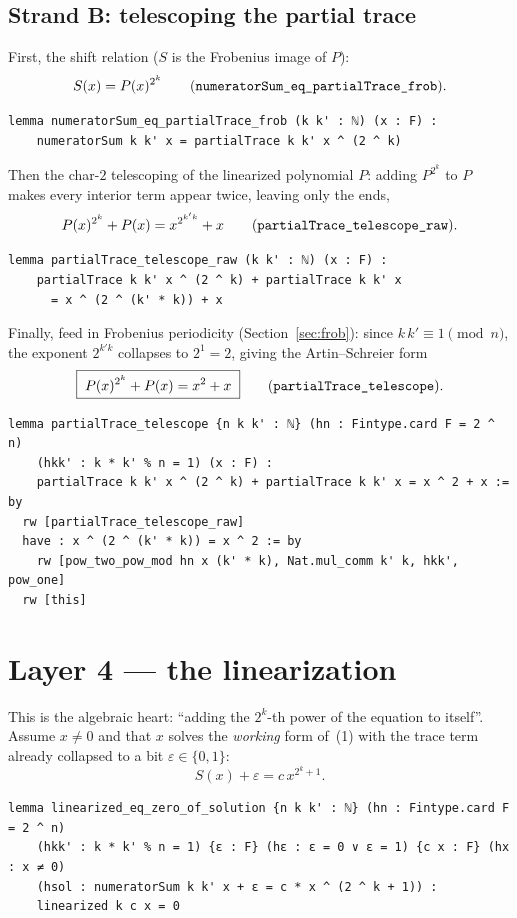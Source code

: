 \documentclass[11pt]{article}
\newcommand{\lc}[1]{\texttt{#1}}
\begin{document}
\subsection{Strand B: telescoping the partial trace}
First, the shift relation ($S$ is the Frobenius image of $P$):
\[
  S(x)=P(x)^{2^k}\qquad\text{(\lc{numeratorSum\_eq\_partialTrace\_frob})}.
\]
\begin{lstlisting}
lemma numeratorSum_eq_partialTrace_frob (k k' : ℕ) (x : F) :
    numeratorSum k k' x = partialTrace k k' x ^ (2 ^ k)
\end{lstlisting}
Then the char-$2$ telescoping of the linearized polynomial $P$: adding
$P^{2^k}$ to $P$ makes every interior term appear twice, leaving only the ends,
\[
  P(x)^{2^k}+P(x)=x^{2^{k'k}}+x
  \qquad\text{(\lc{partialTrace\_telescope\_raw})}.
\]
\begin{lstlisting}
lemma partialTrace_telescope_raw (k k' : ℕ) (x : F) :
    partialTrace k k' x ^ (2 ^ k) + partialTrace k k' x
      = x ^ (2 ^ (k' * k)) + x
\end{lstlisting}
Finally, feed in Frobenius periodicity (Section~\ref{sec:frob}): since
$k\,k'\equiv1\pmod n$, the exponent $2^{k'k}$ collapses to $2^1=2$, giving the
Artin--Schreier form
\[
  \boxed{\;P(x)^{2^k}+P(x)=x^2+x\;}
  \qquad\text{(\lc{partialTrace\_telescope})}.
\]
\begin{lstlisting}
lemma partialTrace_telescope {n k k' : ℕ} (hn : Fintype.card F = 2 ^ n)
    (hkk' : k * k' % n = 1) (x : F) :
    partialTrace k k' x ^ (2 ^ k) + partialTrace k k' x = x ^ 2 + x := by
  rw [partialTrace_telescope_raw]
  have : x ^ (2 ^ (k' * k)) = x ^ 2 := by
    rw [pow_two_pow_mod hn x (k' * k), Nat.mul_comm k' k, hkk', pow_one]
  rw [this]
\end{lstlisting}

\section{Layer 4 --- the linearization}
This is the algebraic heart: ``adding the $2^k$-th power of the equation to
itself''.  Assume $x\neq0$ and that $x$ solves the \emph{working} form of~(1)
with the trace term already collapsed to a bit $\varepsilon\in\{0,1\}$:
\[
  S(x)+\varepsilon=c\,x^{2^k+1}. \tag{$1'$}
\]

\begin{lstlisting}
lemma linearized_eq_zero_of_solution {n k k' : ℕ} (hn : Fintype.card F = 2 ^ n)
    (hkk' : k * k' % n = 1) {ε : F} (hε : ε = 0 ∨ ε = 1) {c x : F} (hx : x ≠ 0)
    (hsol : numeratorSum k k' x + ε = c * x ^ (2 ^ k + 1)) :
    linearized k c x = 0
\end{lstlisting}
\end{document}
